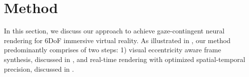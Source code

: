 \section{Method}
\label{sec:method}
In this section, we discuss our approach to achieve gaze-contingent neural rendering for 6DoF immersive virtual reality. As illustrated in , our method predominantly comprises of two steps: 1) visual eccentricity aware frame synthesis, discussed in , and real-time rendering with optimized spatial-temporal precision, discussed in .

\begin{figure}[htb]
    \centering
    

\end{figure}
